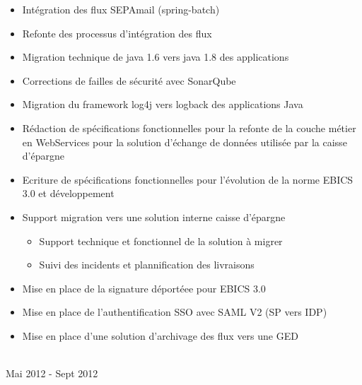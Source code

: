 \documentclass[letterpaper]{twentysecondcv} %
\begin{document}
\begin{twenty}
{\begin{itemize}
{\begin{itemize}
	\end{itemize}}
	\item Intégration des flux  SEPAmail (spring-batch)
	 \item Refonte des processus d'intégration des flux
	 \item Migration technique de java 1.6 vers java 1.8 des applications
	 \item Corrections de failles de sécurité avec SonarQube
	 \item Migration du framework log4j vers logback des applications Java
	\item Rédaction de spécifications fonctionnelles pour la refonte de la couche métier en WebServices pour la solution d'échange de données utilisée par la caisse d’épargne
	\item Ecriture de spécifications fonctionnelles pour l’évolution de la norme EBICS 3.0 et développement
	\item Support migration vers une solution interne caisse d'épargne
        {\begin{itemize}
                \item Support technique et fonctionnel de la solution à migrer
                \item Suivi des incidents et plannification des livraisons
	\end{itemize}}
        \item Mise en place de la signature déportéee pour EBICS 3.0
        \item Mise en place de l'authentification SSO avec SAML V2 (SP vers IDP)
        \item Mise en place d'une solution d'archivage des flux vers une GED
        \end{itemize}}
        \\
	\twentyitem
    	{Mai 2012 -}
		{Sept 2012}

\end{twenty}
\end{document}
